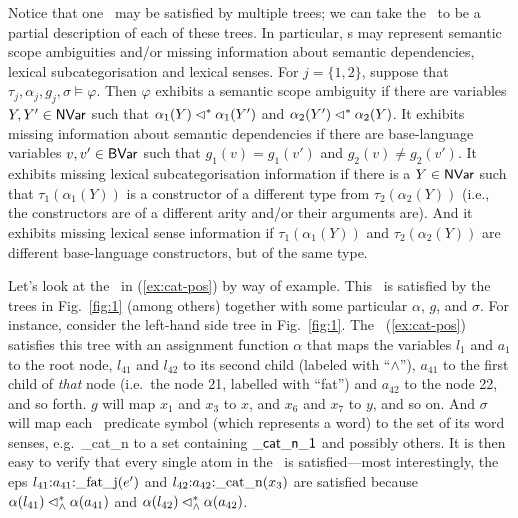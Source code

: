 Notice that one \rmrs\ may be satisfied by multiple trees; we can take
the \rmrs\ to be a partial description of each of these trees.  In
particular, \rmrs s may represent semantic scope ambiguities and/or
missing information about semantic dependencies, lexical
subcategorisation and lexical senses.  For $j=\{1,2\}$, suppose that
$\tau_j,\alpha_j,g_j,\sigma\models \varphi$.  Then $\varphi$ exhibits
a semantic scope ambiguity if there are variables $Y,Y'\in \mathsf{NVar}$ such
that $\alpha_1(Y) \lhd^* \alpha_1(Y')$ and $\alpha_2(Y')\lhd^*
\alpha_2(Y)$.  It exhibits missing information about semantic
dependencies if there are base-language variables $v,v'\in \mathsf{BVar}$ such
that $g_1(v)=g_1(v')$ and $g_2(v)\neq g_2(v')$.  It exhibits missing
lexical subcategorisation information if there is a $ Y \in \mathsf{NVar}$
such that $\tau_1(\alpha_1(Y))$ is a constructor of a different type
from $\tau_2(\alpha_2(Y))$ (i.e., the constructors are of a different
arity and/or their arguments are).  And it exhibits missing lexical
sense information if $\tau_1(\alpha_1(Y))$ and $\tau_2(\alpha_2(Y))$
are different base-language constructors, but of the same type.

Let's look at the \rmrs\ in (\ref{ex:cat-pos}) by way of example.
This \rmrs\ is satisfied by the trees in Fig.~\ref{fig:1} (among
others) together with some particular $\alpha$, $g$, and $\sigma$.
For instance, consider the left-hand side tree in Fig.~\ref{fig:1}.
The \rmrs\ (\ref{ex:cat-pos}) satisfies this tree with an assignment
function $\alpha$ that maps the variables $l_1$ and $a_1$ to the root
node, $l_{41}$ and $l_{42}$ to its second child (labeled with
``$\wedge$''), $a_{41}$ to the first child of \emph{that} node (i.e.\
the node 21, labelled with ``fat'') and $a_{42}$ to the node 22, and
so forth.  $g$ will map $x_1$ and $x_3$ to $x$, and $x_6$ and $x_7$ to
$y$, and so on.  And $\sigma$ will map each \rmrs\ predicate symbol
(which represents a word) to the set of its word senses, e.g.\
\_cat\_n to a set containing $\mathsf{\_cat\_n\_1}$ and possibly others.
It is then easy to verify that every single atom in the \rmrs\ is
satisfied---most interestingly, the {\sc ep}s
$l_{41} {:} a_{41} {:} \mathrm{\_fat\_j}(e')$ and
$l_{42} {:} a_{42} {:} \mathrm{\_cat\_n}(x_3)$ are satisfied because
$\alpha(l_{41}) \lhd^*_\wedge \alpha(a_{41})$ and $\alpha(l_{42})
\lhd^*_\wedge \alpha(a_{42})$.

